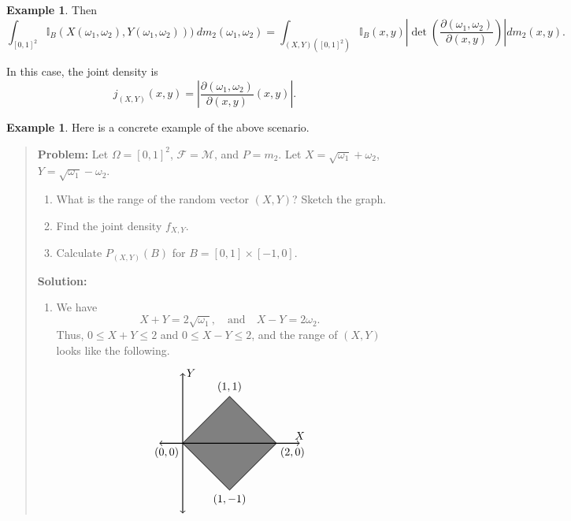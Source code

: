 \documentclass[a4paper,12pt]{scrreprt}
\newcommand{\pder}[2]{\frac{\partial #1}{\partial #2}}
\theoremstyle{definition}
\newtheorem{example}[definition]{Example}
\theoremstyle{plain}
\theoremstyle{remark}
\begin{document}
\begin{example}
  Then
  \begin{equation*}
    \int_{{[0, 1]}^{2}} \mathbb{I}_{B}(X(\omega_{1}, \omega_{2}), Y(\omega_{1},\omega_{2})))\ dm_{2}(\omega_{1}, \omega_{2}) = \int_{(X, Y)({[0, 1]}^{2})} \mathbb{I}_{B}(x, y) \left| \det\left( \pder{(\omega_{1}, \omega_{2})}{(x, y)} \right) \right|dm_{2}(x, y).
  \end{equation*}

  In this case, the joint density is
  \begin{equation*}
    j_{(X, Y)}(x, y) = \left| \pder{(\omega_{1}, \omega_{2})}{(x, y)}(x, y) \right|.
  \end{equation*}
\end{example}

\begin{example}
  Here is a concrete example of the above scenario.

  \begin{quote}
    \textbf{Problem:} Let $\Omega = {[0, 1]}^{2}$, $\mathcal{F} = \mathcal{M}$, and $P = m_{2}$. Let $X = \sqrt{\omega_{1}} + \omega_{2}$, $Y = \sqrt{\omega_{1}} - \omega_{2}$.
    \begin{enumerate}
      \item What is the range of the random vector $(X, Y)$? Sketch the graph.

      \item Find the joint density $f_{X, Y}$.

      \item Calculate $P_{(X, Y)}(B)$ for $B = [0, 1] \times [-1, 0]$.
    \end{enumerate}

    \textbf{Solution:}

    \begin{enumerate}
      \item We have
        \begin{equation*}
          X + Y = 2\sqrt{\omega_{1}},\quad \text{and}\quad X - Y = 2\omega_{2}.
        \end{equation*}
        Thus, $0 \leq X + Y \leq 2$ and $0 \leq X - Y \leq 2$, and the range of $(X, Y)$ looks like the following.
        \begin{equation*}
          \begin{tikzpicture}[scale=1.5]
            \draw[fill=gray] (0, 0) -- (1, 1) -- (2, 0) -- (1, -1) -- (0,0);
            \draw [thick, <->] (-0.5, 0) -- (2.5, 0){};
            \draw [thick, <->] (0, -1.5) -- (0, 1.5);
            \draw (0, 0) -- (1, 1) -- (2, 0) -- (1, -1) -- (0,0);
            \node[above] at (2.5, 0) {$X$};
            \node[right] at (0, 1.5) {$Y$};
            \node[below left] at (0, 0) {$(0, 0)$};
            \node[below right] at (2, 0) {$(2, 0)$};
            \node[above] at (1, 1) {$(1, 1)$};
            \node[below] at (1, -1) {$(1, -1)$};
          \end{tikzpicture}
        \end{equation*}


\end{enumerate}
\end{quote}
\end{example}
\end{document}
